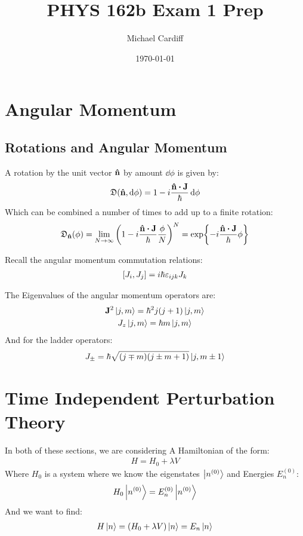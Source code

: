 \documentclass[12pt]{article}
\title{\vspace{-3em}PHYS 162b Exam 1 Prep}
\author{Michael Cardiff}
\date{\today}
\newcommand{\veps}{\varepsilon}
\begin{document}
\maketitle

\section{Angular Momentum}
\subsection{Rotations and Angular Momentum}
A rotation by the unit vector $\vu{n}$ by amount $\dd{\phi}$ is given by:
\begin{align*}
  \mathfrak{D}(\vu{n},\dd{\phi})=1-i\frac{\vu{n}\vdot\vb{J}}{\hbar}\dd{\phi}
\end{align*}
Which can be combined a number of times to add up to a finite rotation:
\begin{align*}
  \mathfrak{D}_{\vu{n}}(\phi)=
  \lim_{N\to\infty}\qty(1-i\frac{\vu{n}\vdot\vb{J}}{\hbar}\frac{\phi}{N})^N
  =\exp{-i\frac{\vu{n}\vdot\vb{J}}{\hbar}\phi}
\end{align*}

Recall the angular momentum commutation relations:
\begin{align*}
  \comm{J_i}{J_j}=i\hbar\veps_{ijk}J_k
\end{align*}

The Eigenvalues of the angular momentum operators are:
\begin{gather*}
  \vb{J}^2\ket{j,m}=\hbar^2j(j+1)\ket{j,m}\\
  J_z\ket{j,m}=\hbar m\ket{j,m}
\end{gather*}
And for the ladder operators:
\begin{align*}
  J_\pm=\hbar\sqrt{(j\mp m)(j\pm m+1)}\ket{j,m\pm1}
\end{align*}
\section{Time Independent Perturbation Theory}
In both of these sections, we are considering A Hamiltonian of the form:
\begin{align*}
  H=H_0+\lambda V
\end{align*}
Where $H_0$ is a system where we know the eigenstates $\ket{n^{(0)}}$ and Energies $E_n^{(0)}$:
\begin{align*}
  H_0\ket{n^{(0)}}=E_n^{(0)}\ket{n^{(0)}}
\end{align*}
And we want to find:
\begin{align*}
  H\ket{n}=(H_0+\lambda V)\ket{n}=E_n\ket{n}
\end{align*}
\end{document}

